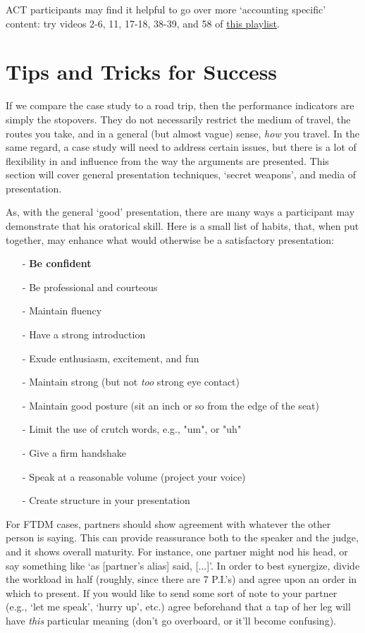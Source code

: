 \documentclass[12pt]{article}
\begin{document}
	ACT participants may find it helpful to go over more \lq accounting specific' content: try videos 2-6, 11, 17-18, 38-39, and 58 of \href{https://www.youtube.com/playlist?list=PL_PmoCeUoNMIX3zP2yYSAq8gi6irBVh-1}{this playlist}.



\section{Tips and Tricks for Success}

If we compare the case study to a road trip, then the performance indicators are simply the stopovers. They do not necessarily restrict the medium of travel, the routes you take, and in a general (but almost vague) sense, \textit{how} you travel. In the same regard, a case study will need to address certain issues, but there is a lot of flexibility in and influence from the way the arguments are presented. This section will cover general presentation techniques, \lq secret weapons', and media of presentation.

As, with the general \lq good' presentation, there are many ways a participant may demonstrate that his oratorical skill. Here is a small list of habits, that, when put together, may enhance what would otherwise be a satisfactory presentation:

\begin{itemize}
	\item[-] \textbf{Be confident}
	\item[-] Be professional and courteous
	\item[-] Maintain fluency
	\item[-] Have a strong introduction
	\item[-] Exude enthusiasm, excitement, and fun
	\item[-] Maintain strong (but not \textit{too} strong eye contact)
	\item[-] Maintain good posture (sit an inch or so from the edge of the seat)
	\item[-] Limit the use of crutch words, e.g., "um", or "uh"
	\item[-] Give a firm handshake
	\item[-] Speak at a reasonable volume (project your voice)
	\item[-] Create structure in your presentation
\end{itemize}

For FTDM cases, partners should show agreement with whatever the other person is saying. This can provide reassurance both to the speaker and the judge, and it shows overall maturity. For instance, one partner might nod his head, or say something like \lq as [partner's alias] said, [...]'.  In order to best synergize, divide the workload in half (roughly, since there are 7 P.I.'s) and agree upon an order in which to present. If you would like to send some sort of note to your partner (e.g., \lq let me speak', \lq hurry up', etc.) agree beforehand that a tap of her leg will have \textit{this} particular meaning (don't go overboard, or it'll become confusing). \\
\end{document}
